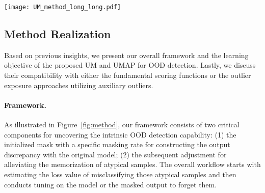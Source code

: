 \documentclass{article}
\theoremstyle{plain}
\theoremstyle{definition}
\theoremstyle{remark}
\begin{document}
\begin{figure*}[t!]
\begin{center}
    \hspace{-0.20in}
\texttt{[image: UM\_method\_long\_long.pdf]}
\end{center}
\vspace{-3mm}
\caption{\textbf{Overview of Unleashing Mask:} Given a well-trained model, we initialize a mask for mining the atypical samples that are sensitive to the changes in model parameters. Then we finetune the original model or adopt pruning with the estimated forgetting threshold, i.e., the loss value estimated by the UM. The final model can serve as the base of those representative score functions to utilize the discriminative features and also as a new initialization of outlier exposure methods. In addition, we also present examples of misclassified samples in ID data after masking the original well-trained model, and loss value using the masked outputs w.r.t. different mask ratios.
}
\label{fig:method}
\vspace{-4mm}
\end{figure*}

\subsection{Method Realization}
\label{sec:method_part3}

Based on previous insights, we present our overall framework and the learning objective of the proposed UM and UMAP for OOD detection. Lastly, we discuss their compatibility with either the fundamental scoring functions or the outlier exposure approaches utilizing auxiliary outliers.

\paragraph{Framework.} As illustrated in Figure~\ref{fig:method}, our framework consists of two critical components for uncovering the intrinsic OOD detection capability: (1) the initialized mask with a specific masking rate for constructing the output discrepancy with the original model; (2) the subsequent adjustment for alleviating the memorization of atypical samples. The overall workflow starts with estimating the loss value of misclassifying those atypical samples and then conducts tuning on the model or the masked output to forget them.
\end{document}

